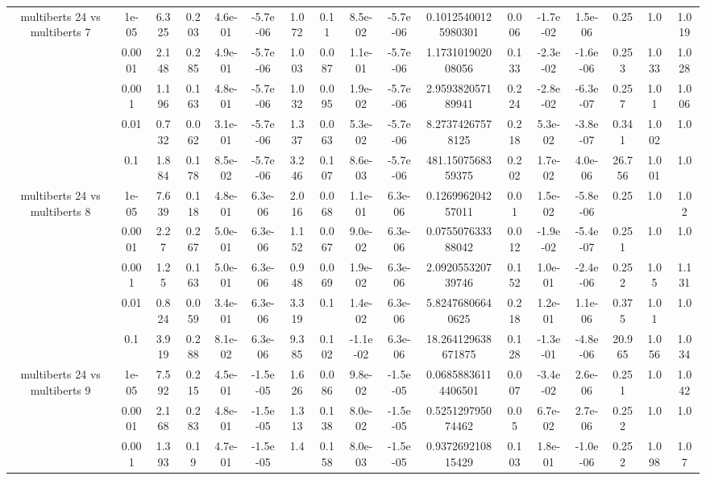 \begin{tabular}{|c|c|c|c|c|c|c|c|c|c|c|c|c|c|c|c|c|}
\hline
\multirow{5}{*}{multiberts 24 vs multiberts 7} & 1e-05 & 6.325 & 0.203 & 4.6e-01 & -5.7e-06 & 1.072 & 0.11 & 8.5e-02 & -5.7e-06 & 0.10125400125980301 & 0.006 & -1.7e-02 & 1.5e-06 & 0.25 & 1.0 & 1.019 \\
 & 0.0001 & 2.148 & 0.285 & 4.9e-01 & -5.7e-06 & 1.003 & 0.087 & 1.1e-01 & -5.7e-06 & 1.173101902008056 & 0.133 & -2.3e-02 & -1.6e-06 & 0.253 & 1.033 & 1.028 \\
 & 0.001 & 1.196 & 0.163 & 4.8e-01 & -5.7e-06 & 1.032 & 0.095 & 1.9e-02 & -5.7e-06 & 2.959382057189941 & 0.224 & -2.8e-02 & -6.3e-07 & 0.257 & 1.01 & 1.006 \\
 & 0.01 & 0.732 & 0.062 & 3.1e-01 & -5.7e-06 & 1.337 & 0.063 & 5.3e-02 & -5.7e-06 & 8.27374267578125 & 0.218 & 5.3e-02 & -3.8e-07 & 0.341 & 1.002 & 1.0 \\
 & 0.1 & 1.884 & 0.178 & 8.5e-02 & -5.7e-06 & 3.246 & 0.107 & 8.6e-03 & -5.7e-06 & 481.1507568359375 & 0.202 & 1.7e-02 & 4.0e-06 & 26.756 & 1.001 & 1.0 \\
\hline
\multirow{5}{*}{multiberts 24 vs multiberts 8} & 1e-05 & 7.639 & 0.118 & 4.8e-01 & 6.3e-06 & 2.016 & 0.068 & 1.1e-01 & 6.3e-06 & 0.126996204257011 & 0.01 & 1.5e-02 & -5.8e-06 & 0.25 & 1.0 & 1.02 \\
 & 0.0001 & 2.27 & 0.267 & 5.0e-01 & 6.3e-06 & 1.152 & 0.067 & 9.0e-02 & 6.3e-06 & 0.075507633388042 & 0.012 & -1.9e-02 & -5.4e-07 & 0.251 & 1.0 & 1.0 \\
 & 0.001 & 1.25 & 0.163 & 5.0e-01 & 6.3e-06 & 0.948 & 0.069 & 1.9e-02 & 6.3e-06 & 2.092055320739746 & 0.152 & 1.0e-01 & -2.4e-06 & 0.252 & 1.05 & 1.131 \\
 & 0.01 & 0.824 & 0.059 & 3.4e-01 & 6.3e-06 & 3.319 & 0.1 & 1.4e-02 & 6.3e-06 & 5.82476806640625 & 0.218 & 1.2e-01 & 1.1e-06 & 0.375 & 1.01 & 1.0 \\
 & 0.1 & 3.919 & 0.288 & 8.1e-02 & 6.3e-06 & 9.385 & 0.102 & -1.1e-02 & 6.3e-06 & 18.264129638671875 & 0.128 & -1.3e-01 & -4.8e-06 & 20.965 & 1.056 & 1.034 \\
\hline
\multirow{5}{*}{multiberts 24 vs multiberts 9} & 1e-05 & 7.592 & 0.215 & 4.5e-01 & -1.5e-05 & 1.626 & 0.086 & 9.8e-02 & -1.5e-05 & 0.06858836114406501 & 0.007 & -3.4e-02 & 2.6e-06 & 0.251 & 1.0 & 1.042 \\
 & 0.0001 & 2.168 & 0.283 & 4.8e-01 & -1.5e-05 & 1.313 & 0.138 & 8.0e-02 & -1.5e-05 & 0.525129795074462 & 0.05 & 6.7e-02 & 2.7e-06 & 0.252 & 1.0 & 1.0 \\
 & 0.001 & 1.393 & 0.19 & 4.7e-01 & -1.5e-05 & 1.4 & 0.158 & 8.0e-03 & -1.5e-05 & 0.937269210815429 & 0.103 & 1.8e-01 & -1.0e-06 & 0.252 & 1.098 & 1.07 \\

\end{tabular}
